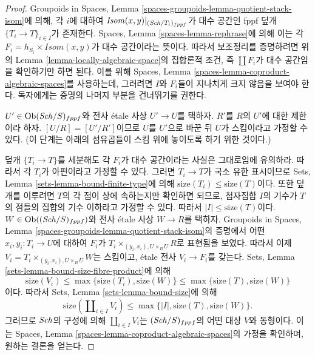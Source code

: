\begin{proof}
Groupoids in Spaces,
Lemma \ref{spaces-groupoids-lemma-quotient-stack-isom}에 의해,
각 $i$에 대하여
$\mathit{Isom}(x, y)|_{(\mathit{Sch}/T_i)_{fppf}}$가 대수 공간인
fppf 덮개 $\{T_i \to T\}_{i \in I}$가 존재한다.
Spaces, Lemma \ref{spaces-lemma-rephrase}에 의해 이는 각
$F_i = h_{S_i} \times \mathit{Isom}(x, y)$가 대수 공간이라는 뜻이다.
따라서 보조정리를 증명하려면 위의
Lemma \ref{lemma-locally-algebraic-space}의 집합론적 조건,
즉 $\coprod F_i$가 대수 공간임을 확인하기만 하면 된다.
이를 위해 Spaces, Lemma
\ref{spaces-lemma-coproduct-algebraic-spaces}를 사용하는데,
그러려면 $I$와 $F_i$들이 지나치게 크지 않음을 보여야 한다.
독자에게는 증명의 나머지 부분을 건너뛰기를 권한다.

\medskip\noindent
$U' \in \mathop{\mathrm{Ob}}\nolimits(\mathit{Sch}/S)_{fppf}$와 전사 \'etale 사상 $U' \to U$를
택하자. $R'$를 $R$의 $U'$에 대한 제한이라 하자.
$[U/R] = [U'/R']$이므로 $U$를 $U'$으로 바꾼 뒤
$U$가 스킴이라고 가정할 수 있다.
(이 단계는 아래의 섬유곱들이 스킴 위에 놓이도록 하기 위한 것이다.)

\medskip\noindent
덮개 $\{T_i \to T\}$를 세분해도 각 $F_i$가 대수 공간이라는
사실은 그대로임에 유의하라. 따라서 각 $T_i$가 아핀이라고
가정할 수 있다. 그러면 $T_i \to T$가 국소 유한 표시이므로
Sets, Lemma \ref{sets-lemma-bound-finite-type}에 의해
$\text{size}(T_i) \leq \text{size}(T)$이다.
또한 덮개를 이루려면 $T$의 각 점이 상에 속하는지만 확인하면
되므로, 첨자집합 $I$의 기수가 $T$의 점들의 집합의 기수 이하라고
가정할 수 있다. 따라서 $|I| \leq \text{size}(T)$이다.
$W \in \mathop{\mathrm{Ob}}\nolimits((\mathit{Sch}/S)_{fppf})$와 전사 \'etale 사상 $W \to R$를
택하자. Groupoids in Spaces,
Lemma \ref{spaces-groupoids-lemma-quotient-stack-isom}의 증명에서
어떤 $x_i, y_i : T_i \to U$에 대하여 $F_i$가
$T_i \times_{(y_i, x_i), U \times_B U} R$로 표현됨을 보였다.
따라서 이제
$V_i = T_i \times_{(y_i, x_i), U \times_B U} W$는 스킴이고,
\'etale 전사 $V_i \to F_i$를 갖는다.
Sets, Lemma \ref{sets-lemma-bound-size-fibre-product}에 의해
$$
\text{size}(V_i) \leq \max\{\text{size}(T_i), \text{size}(W)\}
\leq \max\{\text{size}(T), \text{size}(W)\}
$$
이다. 따라서 Sets, Lemma \ref{sets-lemma-bound-size}에 의해
$$
\text{size}(\coprod\nolimits_{i \in I} V_i)
\leq \max\{|I|, \text{size}(T), \text{size}(W)\}.
$$
그러므로 $\mathit{Sch}$의 구성에 의해
$\coprod_{i \in I} V_i$는 $(\mathit{Sch}/S)_{fppf}$의 어떤 대상 $V$와
동형이다. 이는 Spaces, Lemma
\ref{spaces-lemma-coproduct-algebraic-spaces}의 가정을 확인하며,
원하는 결론을 얻는다.
\end{proof}

